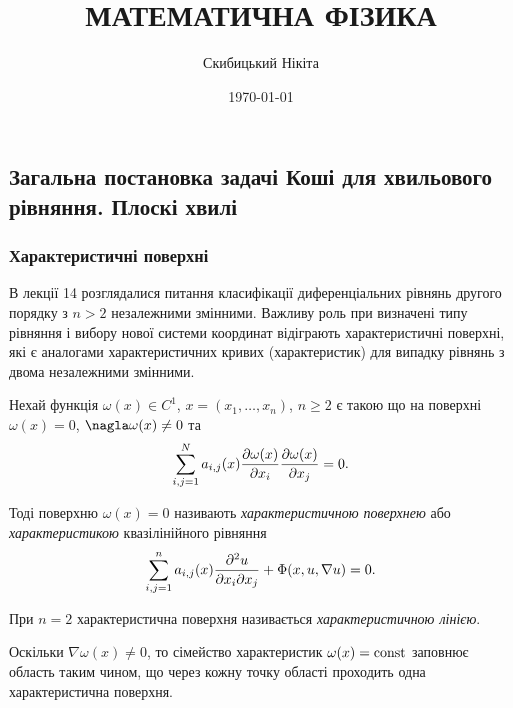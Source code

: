 

\title{{\Huge МАТЕМАТИЧНА ФІЗИКА}}
\author{Скибицький Нікіта}
\date{\today}





\tableofcontents

\setcounter{section}{3}
\setcounter{subsection}{8}

\subsection{Загальна постановка задачі Коші для хвильового рівняння. Плоскі хвилі}

\subsubsection{Характеристичні поверхні}

В лекції 14 розглядалися питання класифікації диференціальних рівнянь другого порядку з $n > 2$ незалежними змінними. Важливу роль при визначені типу рівняння і вибору нової системи координат відіграють характеристичні поверхні, які є аналогами характеристичних кривих (характеристик) для випадку рівнянь з двома незалежними змінними. \medskip

Нехай функція $\omega(x) \in C^1$, $x = (x_1, \ldots, x_n)$, $n \ge 2$ є такою що на поверхні $\omega(x) = 0$, $\nagla \omega(x) \ne 0$ та
\begin{equation}
    \displaystyle\sum\limits_{i, j = 1}^N a_{i,j}(x) \frac{\partial \omega(x)}{\partial x_i} \frac{\partial \omega(x)}{\partial x_j} = 0.
\end{equation}

\begin{definition}
    Тоді поверхню $\omega(x) = 0$ називають \textit{характеристичною поверхнею} або \textit{характеристикою} квазілінійного рівняння
    \begin{equation}
        \displaystyle\sum\limits_{i, j = 1}^n a_{i, j}(x) \frac{\partial^2 u}{\partial x_i \partial x_j} + \Phi(x, u, \nabla u) = 0.
    \end{equation}
\end{definition}

\begin{definition}
    При $n = 2$ характеристична поверхня називається \textit{характеристичною лінією}.
\end{definition}

Оскільки $\nabla \omega(x) \ne 0$, то сімейство характеристик $\omega(x) = \operatorname{const}$ заповнює область таким чином, що через кожну точку області проходить одна характеристична поверхня. \medskip

